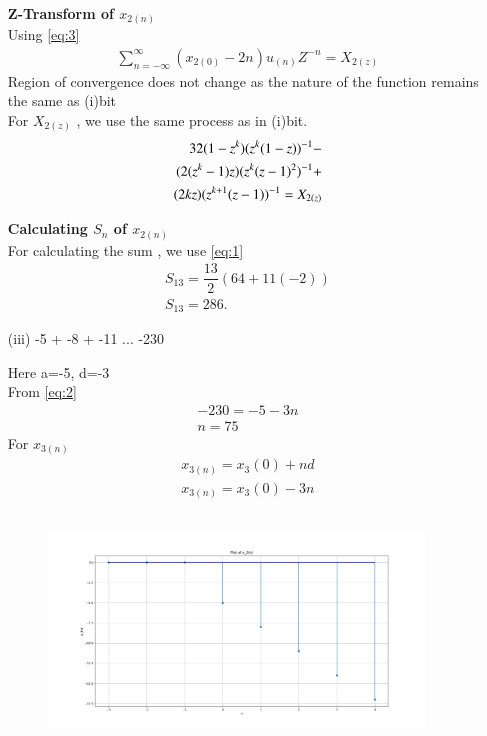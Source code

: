 \documentclass[journal,12pt,twocolumn]{IEEEtran}
\theoremstyle{remark}
\begin{document}
\begin{enumerate}
\\
\textbf{Z-Transform of $x_{2(n)}$}\\
Using \eqref{eq:3}\\
\begin{align}
\sum_{n=-\infty}^{\infty}(x_{2(0)} -2n)u_{(n)}Z^{-n} =X_{2(z)}
\end{align}
Region of convergence does not change as the nature of the function remains the same as (i)bit\\
For $X_{2(z)}$ , we use the same process as in (i)bit.
\begin{align}
   \notag 32(1-z^k)(z^k(1-z))^{-1}-
   \\ \notag(2(z^k-1)z)(z^k(z-1)^2)^{-1}+\\ (2kz)(z^{k+1}(z-1))^{-1}=X_{2(z)}
\end{align}

\textbf{Calculating $S_n$ of $x_{2(n)}$}\\
For calculating the sum , we use \eqref{eq:1}
\begin{align}
 S_{13} = \dfrac{13}{2}(64+11(-2))\\
 S_{13}= 286.
 \end{align}
 
\vspace{0.5cm}
\item[(iii)]
-5 + -8 + -11 ... -230\\
\vspace{0.2cm}

Here a=-5, d=-3\\
From \eqref{eq:2}
\begin{align}
-230= -5 -3n \\
n=75
\end{align}
For $x_{3(n)}$
\begin{align}
x_{3(n)} = x_3{(0)} + nd\\
x_{3(n)}=x_3{(0)} - 3n
\end{align}

\begin{figure}[!ht]   
\centering
\graphicspath{ {figs/} }
\includegraphics[width=10cm, height=6cm]{graph_3}
\label{graph:4}
\end{figure}


\end{enumerate}
\end{document}
